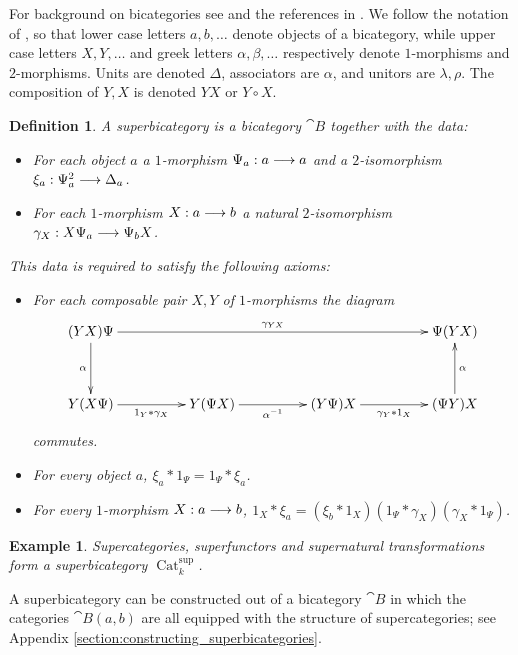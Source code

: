 \documentclass[english,letter paper,12pt,leqno]{article}
\theoremstyle{example}
\newtheorem{definition}[theorem]{Definition}
\newtheorem{example}[theorem]{Example}
\numberwithin{equation}{section}
\DeclareMathOperator{\Cat}{Cat}
\begin{document}
For background on bicategories see \cite{bor94} and the references in \cite{lgdual}. We follow the notation of \cite{lgdual}, so that lower case letters $a,b, \ldots$ denote objects of a bicategory, while upper case letters $X,Y, \ldots$ and greek letters $\alpha, \beta, \ldots$ respectively denote $1$-morphisms and $2$-morphisms. Units are denoted $\Delta$, associators are $\alpha$, and unitors are $\lambda, \rho$. The composition of $Y,X$ is denoted $YX$ or $Y \circ X$.

\begin{definition} A \emph{superbicategory} is a bicategory $\cat{B}$ together with the data:
\begin{itemize}
\item For each object $a$ a $1$-morphism $\Psi_a: a \longrightarrow a$ and a $2$-isomorphism $\xi_a: \Psi^2_a \longrightarrow \Delta_a$.
\item For each $1$-morphism $X: a \longrightarrow b$ a natural $2$-isomorphism $\gamma_X: X \Psi_a \longrightarrow \Psi_b X$.
\end{itemize}
This data is required to satisfy the following axioms:
\begin{itemize}
\item For each composable pair $X,Y$ of $1$-morphisms the diagram
\[
\xymatrix@C+2pc@R+1pc{
(YX) \Psi \ar[rrr]^-{\gamma_{YX}} \ar[d]_-{\alpha} & & & \Psi ( YX )\\
Y ( X \Psi ) \ar[r]_-{1_Y * \gamma_X} & Y( \Psi X ) \ar[r]_-{\alpha^{-1}} & ( Y \Psi ) X \ar[r]_-{\gamma_Y * 1_X} & (\Psi Y ) X \ar[u]_-{\alpha}
}
\]
commutes.
\item For every object $a$, $\xi_a * 1_\Psi = 1_\Psi * \xi_a$.
\item For every $1$-morphism $X : a \longrightarrow b$, $1_X * \xi_a = ( \xi_b * 1_X ) ( 1_\Psi * \gamma_X ) (\gamma_X * 1_\Psi )$.
\end{itemize}
\end{definition}

\begin{example} Supercategories, superfunctors and supernatural transformations form a superbicategory $\Cat^{\operatorname{sup}}_k$.
\end{example}

A superbicategory can be constructed out of a bicategory $\cat{B}$ in which the categories $\cat{B}(a,b)$ are all equipped with the structure of supercategories; see Appendix \ref{section:constructing_superbicategories}.
\end{document}
